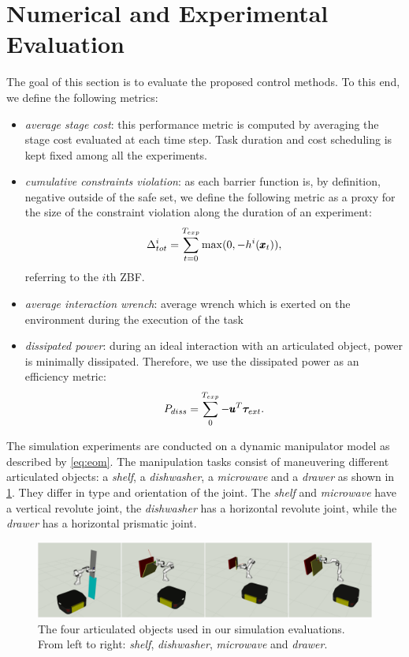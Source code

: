 \section{Numerical and Experimental Evaluation} \label{sec:experiments}

The goal of this section is to evaluate the proposed control methods. To this end, we define the following metrics:
\begin{itemize}
    \item \textit{average stage cost}: this performance metric is computed by averaging the stage cost evaluated at each time step. Task duration and cost scheduling is kept fixed among all the experiments.  
    \item \textit{cumulative constraints violation}: as each barrier function is, by definition, negative outside of the safe set, we define the following metric as a proxy for the size of the constraint violation along the duration of an experiment:
    \begin{equation*}
        \Delta^{i}_{tot} = \sum\limits_{t=0}^{T_{exp}} \max(0, -h^i(\pmb{x}_t)),
    \end{equation*}
    referring to the $i$th ZBF.
    \item \textit{average interaction wrench}: average wrench which is exerted on the environment during the execution of the task
    \item \textit{dissipated power}: during an ideal interaction with an articulated object, power is minimally dissipated. Therefore, we use the dissipated power as an efficiency metric:
    \begin{equation}
        P_{diss} = \sum\limits_{0}^{T_{exp}} -\pmb{u}^T \boldsymbol{\tau}_{ext}.
    \end{equation}
\end{itemize}
The simulation experiments are conducted on a dynamic manipulator model as described by \eqref{eq:eom}. The manipulation tasks consist of maneuvering different articulated objects: a \textit{shelf}, a \textit{dishwasher}, a \textit{microwave} and a \textit{drawer} as shown in \fig\ref{fig:object_manipulation}. They differ in type and orientation of the joint. The \textit{shelf} and \textit{microwave} have a vertical revolute joint, the \textit{dishwasher} has a horizontal revolute joint, while the \textit{drawer} has a horizontal prismatic joint.
  
\begin{figure}[t]
\centering
  \includegraphics[width=\columnwidth]{framework_manipulation/figures/mosaics/articulated_objects_sim.pdf}
  \caption{The four articulated objects used in our simulation evaluations. From left to right: \textit{shelf}, \textit{dishwasher}, \textit{microwave} and \textit{drawer}.} \label{fig:object_manipulation}
\end{figure}


